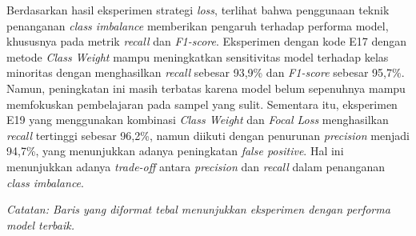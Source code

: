 Berdasarkan hasil eksperimen strategi \textit{loss}, terlihat bahwa penggunaan teknik penanganan \textit{class imbalance} memberikan pengaruh terhadap performa model, khususnya pada metrik \textit{recall} dan \textit{F1-score}. Eksperimen dengan kode E17 dengan metode \textit{Class Weight} mampu meningkatkan sensitivitas model terhadap kelas minoritas dengan menghasilkan \textit{recall} sebesar 93,9\% dan \textit{F1-score} sebesar 95,7\%. Namun, peningkatan ini masih terbatas karena model belum sepenuhnya mampu memfokuskan pembelajaran pada sampel yang sulit. Sementara itu, eksperimen E19 yang menggunakan kombinasi \textit{Class Weight} dan \textit{Focal Loss} menghasilkan \textit{recall} tertinggi sebesar 96,2\%, namun diikuti dengan penurunan \textit{precision} menjadi 94,7\%, yang menunjukkan adanya peningkatan \textit{false positive}. Hal ini menunjukkan adanya \textit{trade-off} antara \textit{precision} dan \textit{recall} dalam penanganan \textit{class imbalance}.

\begin{table}[H]
    \centering
    \caption{Hasil Eksperimen Model Multimodal Strategi Penanganan \textit{Class Imbalance}}
    \label{table:4.multimodal_loss}
    \scriptsize
    \setlength{\tabcolsep}{2pt}
    \renewcommand{\arraystretch}{1.1}
    \smallskip
    \begin{flushleft}
    \footnotesize \textit{Catatan: Baris yang diformat tebal menunjukkan eksperimen dengan performa model terbaik.}
    \end{flushleft}
\end{table}

